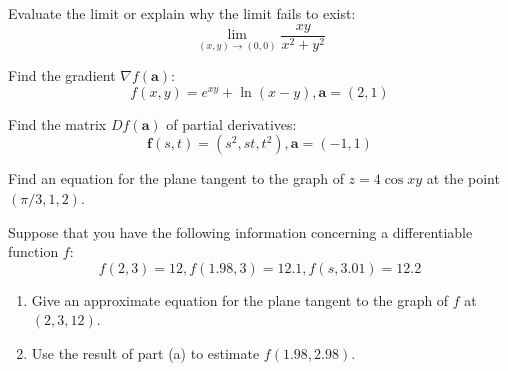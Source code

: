 \documentclass[12pt,letterpaper]{hmcpset}
\newcommand{\vb}{\mathbf}
\begin{document}

\begin{problem}[Colley 2.2.14]
  Evaluate the limit or explain why the limit fails to exist:
  \[ \lim_{(x,y) \to (0,0)} \frac{xy}{x^2 + y^2} \]
\end{problem}
\clearpage
\begin{problem}[Colley 2.3.22]
  Find the gradient $\nabla  f(\vb a)$:
  \[ f(x,y) =  e^{xy} + \ln(x-y), \vb a=(2, 1) \]
\end{problem}
\clearpage

\begin{problem}[Colley 2.3.33]
  Find the matrix $Df(\vb a)$ of partial derivatives:
  \[\vb f(s, t) = (s^2, st, t^2), \vb a = (-1, 1) \]
\end{problem}
\clearpage

\begin{problem}[Colley 2.3.38]
  Find an equation for the plane tangent to the graph of $z = 4\cos x y$ at the point $(\pi /3, 1, 2)$.
\end{problem}
\clearpage

\begin{problem}[Colley 2.3.42]
  Suppose that you have the following information concerning a differentiable function $f$:
  \[ f(2,3) = 12, f(1.98,3) = 12.1, f(s,3.01) = 12.2\]
  \begin{enumerate}[label=(\alph*)]
  \item Give an approximate equation for the plane tangent to the graph of $f$ at $(2,3,12)$.
  \item Use the result of part (a) to estimate $f(1.98, 2.98)$.
  \end{enumerate}
\end{problem}
\clearpage
\end{document}
